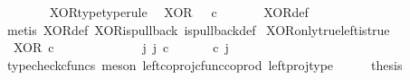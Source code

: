 \begin{isabellebody}
\ \ \ \ \ \ \isanewline
{}\isamarkupfalse%
\ XOR{\isacharunderscore}{\kern0pt}type{\isacharbrackleft}{\kern0pt}type{\isacharunderscore}{\kern0pt}rule{\isacharbrackright}{\kern0pt}{\isacharcolon}{\kern0pt}\isanewline
\ \ {\isachardoublequoteopen}XOR\ {\isacharcolon}{\kern0pt}\ {\isasymOmega}\ {\isasymtimes}\isactrlsub c\ {\isasymOmega}\ {\isasymrightarrow}\ {\isasymOmega}{\isachardoublequoteclose}\isanewline
%
\isadelimproof
\ \ %
\endisadelimproof
%
\isatagproof
{}\isamarkupfalse%
\ XOR{\isacharunderscore}{\kern0pt}def\isanewline
\ \ \isamarkupfalse%
\ {\isacharparenleft}{\kern0pt}metis\ XOR{\isacharunderscore}{\kern0pt}def\ XOR{\isacharunderscore}{\kern0pt}is{\isacharunderscore}{\kern0pt}pullback\ is{\isacharunderscore}{\kern0pt}pullback{\isacharunderscore}{\kern0pt}def{\isacharparenright}{\kern0pt}%
\endisatagproof
{\isafoldproof}%
%
\isadelimproof
\isanewline
%
\endisadelimproof
\isanewline
{}\isamarkupfalse%
\ XOR{\isacharunderscore}{\kern0pt}only{\isacharunderscore}{\kern0pt}true{\isacharunderscore}{\kern0pt}left{\isacharunderscore}{\kern0pt}is{\isacharunderscore}{\kern0pt}true{\isacharcolon}{\kern0pt}\isanewline
\ \ {\isachardoublequoteopen}XOR\ {\isasymcirc}\isactrlsub c\ \ {\isasymlangle}{\isasymt}{\isacharcomma}{\kern0pt}{\isasymf}{\isasymrangle}\ {\isacharequal}{\kern0pt}\ {\isasymt}{\isachardoublequoteclose}\isanewline
%
\isadelimproof
%
\endisadelimproof
%
\isatagproof
{}\isamarkupfalse%
\ {\isacharminus}{\kern0pt}\ \ \ \isanewline
\ \ \isamarkupfalse%
\ {\isachardoublequoteopen}{\isasymexists}\ j{\isachardot}{\kern0pt}\ j\ {\isasymin}\isactrlsub c\ {\isasymone}{\isasymCoprod}{\isasymone}\ {\isasymand}\ {\isacharparenleft}{\kern0pt}{\isasymlangle}{\isasymt}{\isacharcomma}{\kern0pt}\ {\isasymf}{\isasymrangle}\ {\isasymamalg}{\isasymlangle}{\isasymf}{\isacharcomma}{\kern0pt}\ {\isasymt}{\isasymrangle}{\isacharparenright}{\kern0pt}\ {\isasymcirc}\isactrlsub c\ j\ \ {\isacharequal}{\kern0pt}\ {\isasymlangle}{\isasymt}{\isacharcomma}{\kern0pt}{\isasymf}{\isasymrangle}{\isachardoublequoteclose}\isanewline
\ \ \ \ \isamarkupfalse%
\ {\isacharparenleft}{\kern0pt}typecheck{\isacharunderscore}{\kern0pt}cfuncs{\isacharcomma}{\kern0pt}\ meson\ left{\isacharunderscore}{\kern0pt}coproj{\isacharunderscore}{\kern0pt}cfunc{\isacharunderscore}{\kern0pt}coprod\ left{\isacharunderscore}{\kern0pt}proj{\isacharunderscore}{\kern0pt}type{\isacharparenright}{\kern0pt}\isanewline
\ \ \isamarkupfalse%
\ \isamarkupfalse%
\ {\isacharquery}{\kern0pt}thesis\isanewline

\end{isabellebody}
